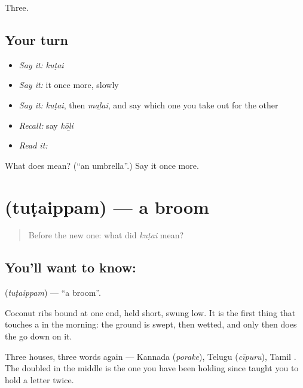 \begin{grammarlens}[title={What you've built}]
Three.
\end{grammarlens}

\subsection*{Your turn}
\begin{itemize}
\raggedright
  \item \emph{Say it:} \emph{kuṭai}
  \item \emph{Say it:} it once more, slowly
  \item \emph{Say it:} \emph{kuṭai}, then \emph{maḻai}, and say which one you take out for the other
  \item \emph{Recall:} say \emph{kōḻi}
  \item \emph{Read it:} \textbf{}
\end{itemize}

\begin{tcolorbox}[breakable,colback=teal!4,colframe=teal!35!black,title={Before you move on}]
What does  mean? (\textquotedblleft{}an umbrella\textquotedblright{}.) Say it once more.
\end{tcolorbox}
\section[\texorpdfstring{\ta{துடைப்பம்} (tuṭaippam)}{துடைப்பம் (tuṭaippam)}]{ (tuṭaippam) — a broom}

\label{lesson:TA-C60-broom}



\begin{quote}
Before the new one: what did \emph{kuṭai} mean?
\end{quote}

\subsection*{You'll want to know: }
\textbf{} (\emph{tuṭaippam}) — \textquotedblleft{}a broom\textquotedblright{}.

Coconut ribs bound at one end, held short, swung low. It is the first thing that touches a  in the morning: the ground is swept, then wetted, and only then does the  go down on it.

Three houses, three words again — Kannada  (\emph{porake}), Telugu  (\emph{cīpuru}), Tamil . The doubled  in the middle is the one you have been holding since  taught you to hold a letter twice.

